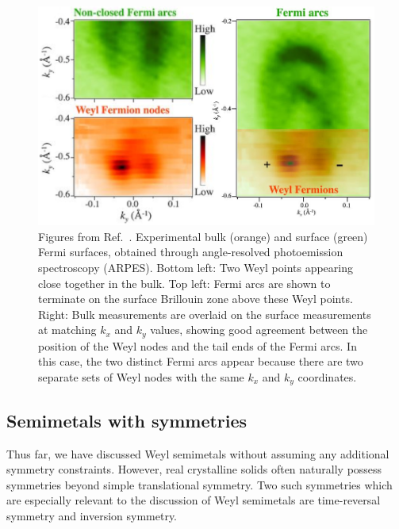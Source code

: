 \begin{figure}[htb!]
	\centering
	\includegraphics[width=.6\linewidth]{Images/TaAs_experiment}
	\caption{Figures from Ref.~\cite{Xu_WSM-experiment}. Experimental bulk (orange) and surface (green) Fermi surfaces, obtained through angle-resolved photoemission spectroscopy (ARPES). Bottom left: Two Weyl points appearing close together in the bulk. Top left: Fermi arcs are shown to terminate on the surface Brillouin zone above these Weyl points. Right: Bulk measurements are overlaid on the surface measurements at matching $k_x$ and $k_y$ values, showing good agreement between the position of the Weyl nodes and the tail ends of the Fermi arcs. In this case, the two distinct Fermi arcs appear because there are two separate sets of Weyl nodes with the same $k_x$ and $k_y$ coordinates.}
	\label{fig:TaAs_experiment}
\end{figure}


\subsection{Semimetals with symmetries}\label{sec:WSM-symmetries}

Thus far, we have discussed Weyl semimetals without assuming any additional symmetry constraints. However, real crystalline solids often naturally possess symmetries beyond simple translational symmetry. Two such symmetries which are especially relevant to the discussion of Weyl semimetals are time-reversal symmetry and inversion symmetry.

